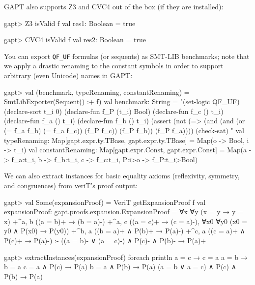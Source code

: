 \documentclass[a4paper,11pt]{book}
\begin{document}
GAPT also supports Z3 and CVC4 out of the box (if they are installed):
\begin{clilisting}
gapt> Z3 isValid f
  val res1: Boolean = true

gapt> CVC4 isValid f
  val res2: Boolean = true

\end{clilisting}

You can export \verb,QF_UF, formulas (or sequents) as SMT-LIB benchmarks;
note that we apply a drastic renaming to the constant symbols in order to
support arbitrary (even Unicode) names in GAPT:
\begin{clilisting}
gapt> val (benchmark, typeRenaming, constantRenaming) = SmtLibExporter(Sequent() :+ f)
val benchmark: String = "(set-logic QF_UF)
(declare-sort t_i 0)
(declare-fun f_P (t_i) Bool)
(declare-fun f_c () t_i)
(declare-fun f_a () t_i)
(declare-fun f_b () t_i)
(assert
  (not
    (=> (and (and (or (= f_a f_b) (= f_a f_c)) (f_P f_c)) (f_P f_b))
      (f_P f_a))))
(check-sat)
"
val typeRenaming: Map[gapt.expr.ty.TBase, gapt.expr.ty.TBase] = Map(o -> Bool, i -> t_i)
val constantRenaming: Map[gapt.expr.Const, gapt.expr.Const] = Map(a -> f_a:t_i, b -> f_b:t_i, c -> f_c:t_i, P:i>o -> f_P:t_i>Bool)

\end{clilisting}

We can also extract instances for basic equality axioms (reflexivity, symmetry,
and congruences) from veriT's proof output:
\begin{clilisting}
gapt> val Some(expansionProof) = VeriT getExpansionProof f
  val expansionProof: gapt.proofs.expansion.ExpansionProof =
  ∀x ∀y (x = y → y = x)
  +^{a, b} ((a = b)+ → (b = a)-)
  +^{a, c} ((a = c)+ → (c = a)-),
  ∀x0 ∀y0 (x0 = y0 ∧ P(x0) → P(y0))
  +^{b, a} ((b = a)+ ∧ P(b)+ → P(a)-)
  +^{c, a} ((c = a)+ ∧ P(c)+ → P(a)-)
  :-
  ((a = b)- ∨ (a = c)-) ∧ P(c)- ∧ P(b)- → P(a)+

gapt> extractInstances(expansionProof) foreach println
  a = c → c = a
  a = b → b = a
  c = a ∧ P(c) → P(a)
  b = a ∧ P(b) → P(a)
  (a = b ∨ a = c) ∧ P(c) ∧ P(b) → P(a)

\end{clilisting}
\end{document}

